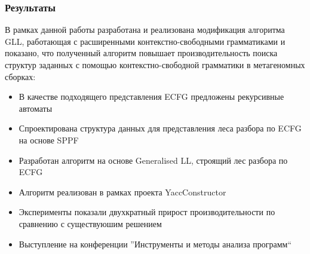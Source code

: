 \documentclass{beamer}
\begin{document}
	\begin{frame} 
		\frametitle{Результаты}
		В рамках данной работы разработана и реализована модификация алгоритма GLL,
		работающая с расширенными контекстно-свободными грамматиками и показано, что полученный
		алгоритм повышает производительность поиска структур заданных с помощью контекстно-свободной
		грамматики в метагеномных сборках:
		\begin{itemize}
			\item В качестве подходящего представления ECFG предложены рекурсивные автоматы
			\item Спроектирована структура данных для представления леса разбора по ECFG на основе SPPF
			\item Разработан алгоритм на основе Generalised LL, строящий лес разбора по ECFG
			\item Алгоритм реализован в рамках проекта YaccConstructor
			\item Эксперименты показали двухкратный прирост производительности по сравнению с существуюшим решением 
			\item Выступление на конференции ''Инструменты и методы анализа программ``
		\end{itemize}		
	\end{frame}
\end{document}
